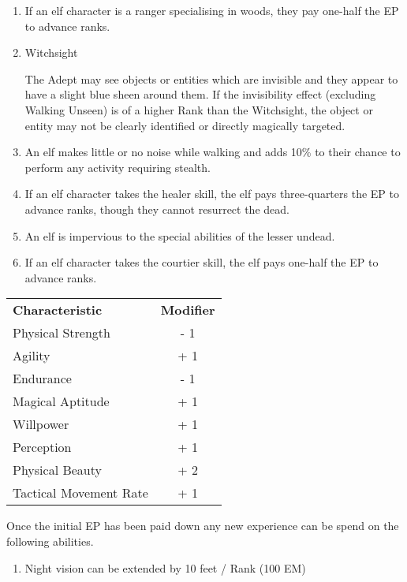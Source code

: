 \documentclass[a4paper]{article}
\begin{document}
\begin{multicols*}{3}
\begin{enumerate}
\item
If an elf character is a ranger specialising in woods, they pay
one-half the EP to advance ranks.

\item
\begin{talent}{Witchsight}
\begin{effects}
The Adept may see objects or entities which are invisible and they
appear to have a slight blue sheen around them. If the invisibility
effect (excluding Walking Unseen) is of a higher Rank than the
Witchsight, the object or entity may not be clearly identified or
directly magically targeted.
\end{effects}
\end{talent}

\item
An elf makes little or no noise while walking and adds 10\% to their
chance to perform any activity requiring stealth.

\item
If an elf character takes the healer skill, the elf pays
three-quarters the EP to advance ranks, though they cannot resurrect
the dead.

\item
An elf is impervious to the special abilities of the lesser undead.

\item
If an elf character takes the courtier skill, the elf pays one-half
the EP to advance ranks.
\end{enumerate}

\begin{tabularx}{\linewidth}{Xc}
\textbf{Characteristic} & \textbf{Modifier} \\
Physical Strength	& - 1 \\
Agility			& + 1 \\
Endurance		& - 1 \\
Magical Aptitude	& + 1 \\
Willpower		& + 1 \\
Perception		& + 1 \\
Physical Beauty		& + 2 \\
Tactical Movement Rate	& + 1 \\
\end{tabularx}

Once the initial EP has been paid down any new experience can be spend
on the following abilities.

\begin{enumerate}
\item
Night vision can be extended by 10 feet / Rank (100 EM)


\end{enumerate}
\end{multicols*}
\end{document}
